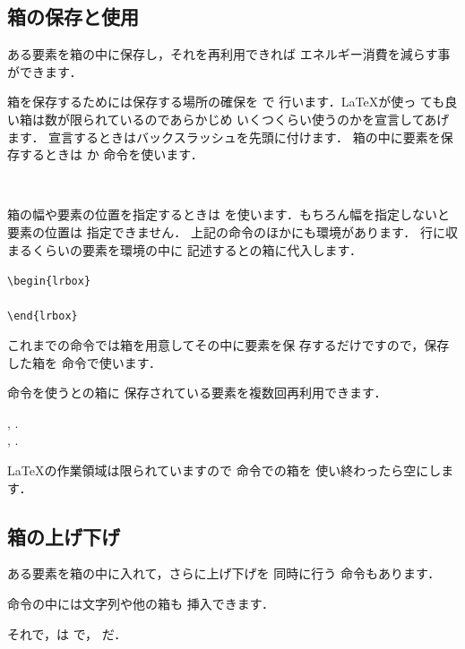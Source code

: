\subsection{箱の保存と使用}%
ある要素を箱の中に保存し，それを再利用できれば
エネルギー消費を減らす事ができます．
\begin{Syntax}
\end{Syntax}
箱を保存するためには保存する場所の確保を で
行います．{\LaTeX}が使っ
ても良い箱は数が限られているのであらかじめ
いくつくらい使うのかを宣言してあげます．
宣言するときはバックスラッシュを先頭に付けます．
箱の中に要素を保存するときは か 命令を使います．
\begin{Syntax}
\\
\end{Syntax}
箱の幅や要素の位置を指定するときは 
を使います．もちろん幅を指定しないと要素の位置は
指定できません．
上記の命令のほかにも環境があります．
行に収まるくらいの要素を環境の中に
記述するとの箱に代入します．
\begin{Syntax}
\verb|\begin{lrbox}|\\
\\
\verb|\end{lrbox}|
\end{Syntax}

これまでの命令では箱を用意してその中に要素を保%
存するだけですので，保存した箱を 命令で使います．
\begin{Syntax}
\end{Syntax}
命令を使うとの箱に
保存されている要素を複数回再利用できます．
\begin{InOut}
\newsavebox{\hoge} 
\usebox{\hoge}, \usebox{\hoge}.\\
\usebox{\hoge}, \usebox{\hoge}.\\
\sbox{\hoge}{}  \usebox{\hoge}
\end{InOut}
{\LaTeX}の作業領域は限られていますので 命令での箱を
使い終わったら空にします．


\subsection{箱の上げ下げ}%
ある要素を箱の中に入れて，さらに上げ下げを
同時に行う 命令もあります．
\begin{Syntax}
\end{Syntax}
命令の中には文字列や他の箱も
挿入できます．
\begin{InOut}
それで，は
で，
だ．
\end{InOut}


